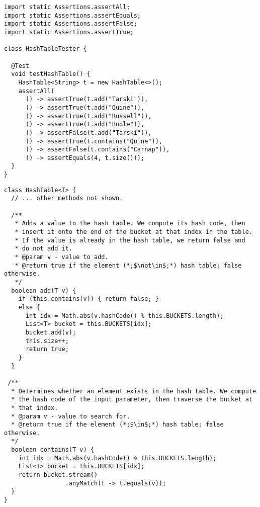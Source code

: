\begin{lstlisting}[language=MyJava]
import static Assertions.assertAll;
import static Assertions.assertEquals;
import static Assertions.assertFalse;
import static Assertions.assertTrue;

class HashTableTester {

  @Test
  void testHashTable() {
    HashTable<String> t = new HashTable<>();
    assertAll(
      () -> assertTrue(t.add("Tarski")),
      () -> assertTrue(t.add("Quine")),
      () -> assertTrue(t.add("Russell")),
      () -> assertTrue(t.add("Boole")),
      () -> assertFalse(t.add("Tarski")),
      () -> assertTrue(t.contains("Quine")),
      () -> assertFalse(t.contains("Carnap")),
      () -> assertEquals(4, t.size()));
  }
}
\end{lstlisting}

\enlargethispage{-2\baselineskip}
\begin{lstlisting}[language=MyJava]
class HashTable<T> {
  // ... other methods not shown.

  /**
   * Adds a value to the hash table. We compute its hash code, then 
   * insert it onto the end of the bucket at that index in the table. 
   * If the value is already in the hash table, we return false and 
   * do not add it.
   * @param v - value to add.
   * @return true if the element (*;$\not\in$;*) hash table; false otherwise.
   */
  boolean add(T v) {
    if (this.contains(v)) { return false; } 
    else {
      int idx = Math.abs(v.hashCode() % this.BUCKETS.length);
      List<T> bucket = this.BUCKETS[idx];
      bucket.add(v);
      this.size++;
      return true;
    }
  }

 /**
  * Determines whether an element exists in the hash table. We compute 
  * the hash code of the input parameter, then traverse the bucket at 
  * that index.
  * @param v - value to search for.
  * @return true if the element (*;$\in$;*) hash table; false otherwise.
  */
  boolean contains(T v) {
    int idx = Math.abs(v.hashCode() % this.BUCKETS.length);
    List<T> bucket = this.BUCKETS[idx];
    return bucket.stream()
                 .anyMatch(t -> t.equals(v));
  }
}
\end{lstlisting}